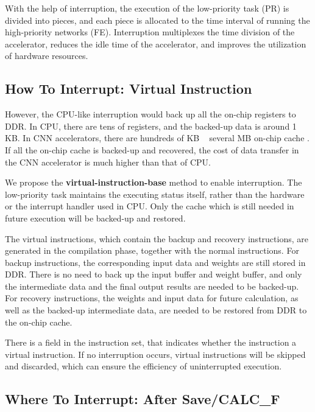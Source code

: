 With the help of interruption, the execution of the low-priority task (PR) is divided into pieces, and each piece is allocated to the time interval of running the high-priority networks (FE). 
Interruption multiplexes the time division of the accelerator, reduces the idle time of the accelerator, and improves the utilization of hardware resources. 

\subsection{How To Interrupt: Virtual Instruction}
\label{sec:howinter}


However, the CPU-like interruption would back up all the on-chip registers to DDR. In CPU, there are tens of registers, and the backed-up data is around 1 KB. In CNN accelerators, there are hundreds of KB ~ several MB on-chip cache \cite{qiu2016going, yu2018instruction}. If all the on-chip cache is backed-up and recovered, the cost of data transfer in the CNN accelerator is much higher than that of CPU.

We propose the \textbf{virtual-instruction-base} method to enable interruption. The low-priority task maintains the executing status itself, rather than the hardware or the interrupt handler used in CPU. Only the cache which is still needed in future execution will be backed-up and restored.

The virtual instructions, which contain the backup and recovery instructions, are generated in the compilation phase, together with the normal instructions. 
For backup instructions, the corresponding input data and weights are still stored in DDR. 
There is no need to back up the input buffer and weight buffer, and only the intermediate data and the final output results are needed to be backed-up. 
For recovery instructions, the weights and input data for future calculation, as well as the backed-up intermediate data, are needed to be restored from DDR to the on-chip cache.

There is a field in the instruction set, that indicates whether the instruction a virtual instruction. If no interruption occurs, virtual instructions will be skipped and discarded, which can ensure the efficiency of uninterrupted execution.

\subsection{ Where To Interrupt: After Save/CALC\_F }
\label{sec:whereinter}

